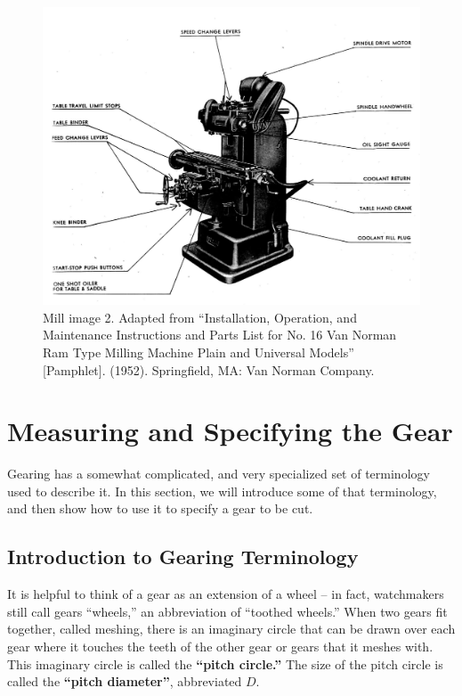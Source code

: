 \documentclass[12pt,twoside,letterpaper]{article}
\begin{document}
\begin{figure}[H]
	\centering
\includegraphics[width=5in]{diagram2}
\caption{Mill image 2. Adapted from ``Installation, Operation, and Maintenance Instructions and Parts List for No. 16 Van Norman Ram Type Milling Machine Plain and Universal Models'' [Pamphlet]. (1952). Springfield, MA: Van Norman Company. }
\end{figure}

\section{Measuring and Specifying the Gear}
\label{sec:measuring}


Gearing has a somewhat complicated, and very specialized set of terminology used to describe it. In this section, we will introduce some of that terminology, and then show how to use it to specify a gear to be cut.



\subsection{Introduction to Gearing Terminology}


It is helpful to think of a gear as an extension of a wheel -- in fact, watchmakers still call gears ``wheels,'' an abbreviation of ``toothed wheels.''  When two gears fit together, called meshing, there is an imaginary circle that can be drawn over each gear where it touches the teeth of the other gear or gears that it meshes with. This imaginary circle is called the \textbf{``pitch circle.''} The size of the pitch circle is called the \textbf{``pitch diameter''}, abbreviated $D$.
\end{document}
